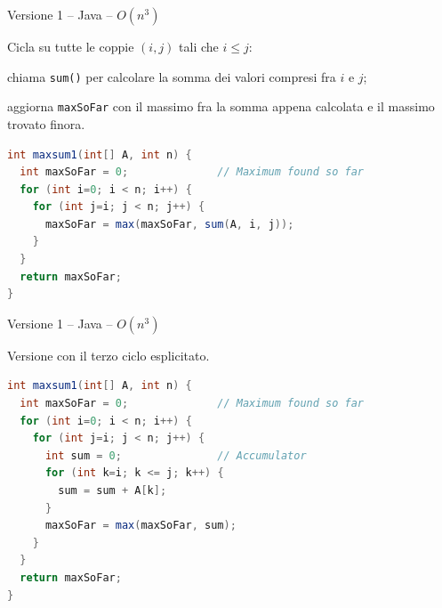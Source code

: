 \begin{frame}[fragile]{Versione 1 -- Java -- $O(n^3)$}


\vspace{-6pt}
\begin{mdframed}[style=mybox]
\begingroup
\small
Cicla su tutte le coppie $(i,j)$ tali che $i \leq j$:
\BI
\item chiama \texttt{sum()} per calcolare la somma dei valori compresi fra $i$ e $j$;
\item aggiorna \texttt{maxSoFar} con il massimo fra la somma appena calcolata e il massimo trovato finora.
\EI
\endgroup
\end{mdframed}

\vspace{-9pt}
\begin{lstlisting}[language=java]
int maxsum1(int[] A, int n) {
  int maxSoFar = 0;              // Maximum found so far
  for (int i=0; i < n; i++) {
    for (int j=i; j < n; j++) {
      maxSoFar = max(maxSoFar, sum(A, i, j));
    }
  }
  return maxSoFar;
}
\end{lstlisting}

\end{frame}

\begin{frame}[fragile]{Versione 1 -- Java -- $O(n^3)$}


\vspace{-6pt}
\begin{mdframed}[style=mybox]
Versione con il terzo ciclo esplicitato.
\end{mdframed}

\vspace{-9pt}
\begin{lstlisting}[language=java]
int maxsum1(int[] A, int n) {
  int maxSoFar = 0;              // Maximum found so far
  for (int i=0; i < n; i++) {
    for (int j=i; j < n; j++) {
      int sum = 0;               // Accumulator
      for (int k=i; k <= j; k++) {
        sum = sum + A[k];
      }
      maxSoFar = max(maxSoFar, sum);
    }
  }
  return maxSoFar;
}
\end{lstlisting}

\end{frame}



